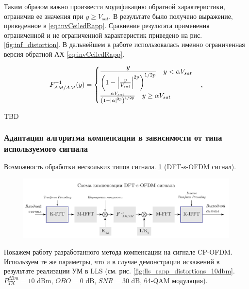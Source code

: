Таким образом важно произвести модификацию обратной характеристики,
ограничив ее значения при $y \geq V_{sat}$. В результате было получено
выражение, приведенное в \ref{eq:invCeiledRapp}. Сравнение результата
применения ограниченной и не ограниченной характеристик приведено на рис.
\ref{fig:inf_distortion}. В дальнейшем в работе использовалась именно
ограниченная версия обратной АХ \ref{eq:invCeiledRapp}.

\begin{equation}
    F^{-1}_{AM/AM}(y) = 
    \begin{cases}
        \displaystyle
       \frac{ y}{\left( 1 - \abs{\frac{y}{V_{sat}}}^{2p}\right)^{1/2p}}
       \quad y <\alpha V_{sat}\\
       \frac{ \alpha V_{sat}}{\left( 1 - \abs{\alpha}^{2p}\right)^{1/2p}}
       \quad y \geq \alpha V_{sat}
    \end{cases},
    \label{eq:invCeiledRapp}
\end{equation}




TBD





\subsubsection{Адаптация алгоритма компенсации в зависимости от типа используемого сигнала}
\label{sec:apadt}
Возможность обработки нескольких типов сигнала.
\ref{fig:dfts_compensation_scheme} (DFT-s-OFDM сигнал). 

\begin{figure}[h!]
    \centering
    \includegraphics[width=0.99\linewidth]{figs/dfts_compensation_scheme.pdf}
    \caption{}
    \label{fig:dfts_compensation_scheme}
\end{figure}

Покажем работу разработанного метода компенсации на сигнале
CP-OFDM. Используем те же параметры, что и в случае демонстрации искажений
в результате реализации УМ в LLS (см. рис.
\ref{fig:lls_rapp_distortions_10dbm}.
$P^{dBm}_{TX} = 10$ dBm, $OBO = 0$ dB, $SNR=30$ dB, 64-QAM модуляция). 

